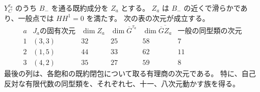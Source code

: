\begin{theorem}[自己反対部分族の次元]
\label{thm:self-opposite-families-v23}
$Y_C^{\tau_a}$ のうち $B_-$ を通る既約成分を $Z_a$ とする。
$Z_a$ は $B_-$ の近くで滑らかであり、一般点では $HH^1=0$ を満たす。
次の表の次元が成立する。
\[
\begin{array}{c|c|c|c|c|c}
 a&J_a\text{の固有次元}&\dim Z_a&
 \dim\overline G^{\tau_a}&\dim\overline{\overline G Z_a}&
 \text{一般の同型類の次元}\\\hline
 1&(3,3)&32&25&58&7\\
 2&(1,5)&44&33&62&11\\
 3&(4,2)&35&27&59&8
\end{array}
\]
最後の列は、各飽和の既約閉包について取る有理商の次元である。
特に、自己反対な有限代数の同型類を、それぞれ七、十一、八次元動かす族を得る。
\end{theorem}

